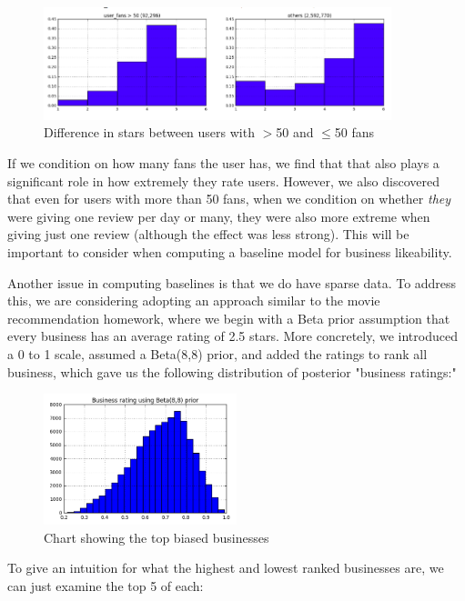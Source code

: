 \documentclass[11pt]{article}
\begin{document}
\begin{figure}[H]
\centering
\includegraphics[width=0.9\textwidth]{./ac209/lotsoffans.png}
\caption{Difference in stars between users with $>$50 and $\leq$50 fans}
\end{figure}

If we condition on how many fans the user has, we find that that also plays a significant role in how extremely they rate users. However, we also discovered that even for users with more than 50 fans, when we condition on whether \textit{they} were giving one review per day or many, they were also more extreme when giving just one review (although the effect was less strong). This will be important to consider when computing a baseline model for business likeability.

\par Another issue in computing baselines is that we do have sparse data. To address this, we are considering adopting an approach similar to the movie recommendation homework, where we begin with a Beta prior assumption that every business has an average rating of 2.5 stars. More concretely, we introduced a 0 to 1 scale, assumed a Beta(8,8) prior, and added the ratings to rank all business, which gave us the following distribution of posterior "business ratings:"

\begin{figure}[H]
\centering
\includegraphics[width=0.5\textwidth]{./ac209/business-ratings-with-title.png}
\caption{Chart showing the top biased businesses}
\end{figure}

\par To give an intuition for what the highest and lowest ranked businesses are, we can just examine the top 5 of each:
\end{document}
